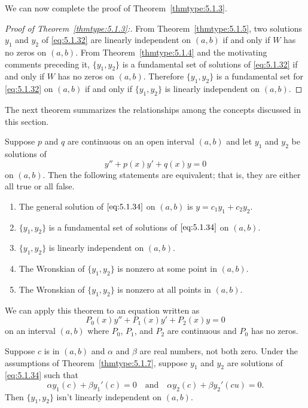 \documentclass{ximera}
\begin{document}
We can now complete the proof of Theorem~\ref{thmtype:5.1.3}.
\begin{proof}[Proof of Theorem~\ref{thmtype:5.1.3}:]
From Theorem~\ref{thmtype:5.1.5}, two solutions $y_1$ and $y_2$ of
\eqref{eq:5.1.32} are linearly
independent on  $(a,b)$ if and only if $W$ has no zeros on  $(a,b)$.
From Theorem~\ref{thmtype:5.1.4} and the motivating comments preceding
it,  $\{y_1,y_2\}$ is  a fundamental set of solutions of
\eqref{eq:5.1.32}  if and only if $W$ has no zeros on  $(a,b)$.
Therefore  $\{y_1,y_2\}$ is   a fundamental set
for \eqref{eq:5.1.32} on  $(a,b)$ if and only if  $\{y_1,y_2\}$
is linearly independent on $(a,b)$. 
\end{proof}
The next theorem summarizes the relationships among the
concepts discussed in this section.
 
\begin{theorem}\label{thmtype:5.1.6}
 Suppose  $p$ and $q$ are continuous on an open interval $(a,b)$
and  let $y_1$ and $y_2$ be solutions of
\begin{equation}\label{eq:5.1.34}
y''+p(x)y'+q(x)y=0
\end{equation}
on  $(a,b).$  Then the following statements are equivalent; that
is, they are either all true or all false.
\begin{enumerate}
\item %
The general solution of $\eqref{eq:5.1.34}$ on  $(a,b)$ is
$y=c_1y_1+c_2y_2$.
\item %
 $\{y_1,y_2\}$ is a fundamental set of solutions of $\eqref{eq:5.1.34}$
on  $(a,b).$
\item %
 $\{y_1,y_2\}$ is linearly independent on  $(a,b)$.
\item %
The Wronskian of   $\{y_1,y_2\}$ is nonzero at some point in  $(a,b)$.
\item %
The Wronskian of   $\{y_1,y_2\}$ is nonzero at all points in  $(a,b)$.
\end{enumerate}
\end{theorem}
 
We can apply this theorem to an equation written as
$$
P_0(x)y''+P_1(x)y'+P_2(x)y=0
$$
on an interval $(a,b)$ where $P_0$, $P_1$, and $P_2$
are continuous and $P_0$ has no zeros.
 
 
\begin{theorem}\label{thmtype:5.1.7}
Suppose  $c$ is in $(a,b)$ and $\alpha$ and $\beta$  are real numbers,
not both zero.
Under the assumptions of Theorem~\ref{thmtype:5.1.7}, suppose
$y_{1}$ and $y_{2}$ are  solutions  of \eqref{eq:5.1.34}   such that
\begin{equation} \label{eq:5.1.35}
\alpha y_{1}(c)+\beta y_{1}'(c)=0\quad\text{and}\quad
\alpha y_{2}(c)+\beta y_{2}'(c u)=0.
\end{equation}
Then $\{y_{1},y_{2}\}$ isn't  linearly independent on $(a,b)$.
\end{theorem}
 
\end{document}
